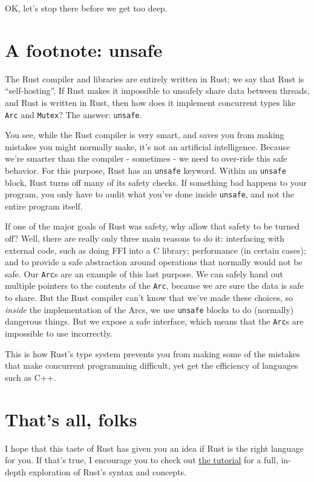 \documentclass[]{article}
\begin{document}
OK, let's stop there before we get too deep.

\section{A footnote: unsafe}\label{a-footnote-unsafe}

The Rust compiler and libraries are entirely written in Rust; we say
that Rust is ``self-hosting''. If Rust makes it impossible to unsafely
share data between threads, and Rust is written in Rust, then how does
it implement concurrent types like \texttt{Arc} and \texttt{Mutex}? The
answer: \texttt{unsafe}.

You see, while the Rust compiler is very smart, and saves you from
making mistakes you might normally make, it's not an artificial
intelligence. Because we're smarter than the compiler - sometimes - we
need to over-ride this safe behavior. For this purpose, Rust has an
\texttt{unsafe} keyword. Within an \texttt{unsafe} block, Rust turns off
many of its safety checks. If something bad happens to your program, you
only have to audit what you've done inside \texttt{unsafe}, and not the
entire program itself.

If one of the major goals of Rust was safety, why allow that safety to
be turned off? Well, there are really only three main reasons to do it:
interfacing with external code, such as doing FFI into a C library;
performance (in certain cases); and to provide a safe abstraction around
operations that normally would not be safe. Our \texttt{Arc}s are an
example of this last purpose. We can safely hand out multiple pointers
to the contents of the \texttt{Arc}, because we are sure the data is
safe to share. But the Rust compiler can't know that we've made these
choices, so \emph{inside} the implementation of the Arcs, we use
\texttt{unsafe} blocks to do (normally) dangerous things. But we expose
a safe interface, which means that the \texttt{Arc}s are impossible to
use incorrectly.

This is how Rust's type system prevents you from making some of the
mistakes that make concurrent programming difficult, yet get the
efficiency of languages such as C++.

\section{That's all, folks}\label{thats-all-folks}

I hope that this taste of Rust has given you an idea if Rust is the
right language for you. If that's true, I encourage you to check out
\href{tutorial.html}{the tutorial} for a full, in-depth exploration of
Rust's syntax and concepts.
\end{document}
